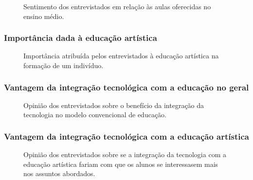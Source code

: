 \documentclass[12pt, a4paper]{article}
\begin{document}
\begin{figure}[H]
	\centering
	\caption{Sentimento dos entrevistados em relação às aulas oferecidas no ensino médio.}
	\label{fig:q7}
\end{figure}

\subsubsection{Importância dada à educação artística}

\begin{figure}[H]
	\centering
	\caption{Importância atribuída pelos entrevistados à educação artística na formação de um indivíduo.}
	\label{fig:q8}
\end{figure}

\subsubsection{Vantagem da integração tecnológica com a educação no geral}

\begin{figure}[H]
	\centering
	\caption{Opinião dos entrevistados sobre o benefício da integração da tecnologia no modelo convencional de educação.}
	\label{fig:q9}
\end{figure}

\subsubsection{Vantagem da integração tecnológica com a educação artística}

\begin{figure}[H]
	\centering
	\caption{Opinião dos entrevistados sobre se a integração da tecnologia com a educação artística fariam com que os alunos se interessasem mais nos assuntos abordados.}
	\label{fig:q10}
\end{figure}
\end{document}
